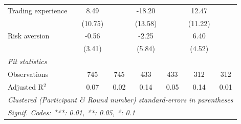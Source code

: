 \begin{tabular}{lcccccc}
   Trading experience                   & 8.49         &               & -18.20       &              & 12.47       &   \\   
                                        & (10.75)      &               & (13.58)      &              & (11.22)     &   \\   
   Risk aversion                        & -0.56        &               & -2.25        &              & 6.40        &   \\   
                                        & (3.41)       &               & (5.84)       &              & (4.52)      &   \\   
   \midrule
   \emph{Fit statistics}\\
   Observations                         & 745          & 745           & 433          & 433          & 312         & 312\\  
   Adjusted R$^2$                       & 0.07         & 0.02          & 0.14         & 0.05         & 0.14        & 0.01\\  
   \midrule \midrule
   \multicolumn{7}{l}{\emph{Clustered (Participant \& Round number) standard-errors in parentheses}}\\
   \multicolumn{7}{l}{\emph{Signif. Codes: ***: 0.01, **: 0.05, *: 0.1}}\\
\end{tabular}
\par\endgroup
